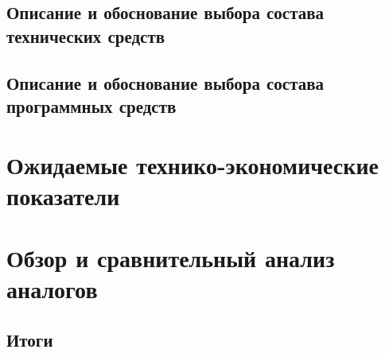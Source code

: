 \documentclass[allcolors=black]{article}
\begin{document}
\paragraph{ }


\subsection{Описание и обоснование выбора состава технических средств}

\subsection{Описание и обоснование выбора состава программных средств}

\section{Ожидаемые технико-экономические показатели}

\section{Обзор и сравнительный анализ аналогов}

\subsubsection*{}

\subsection*{Итоги}
\end{document}
